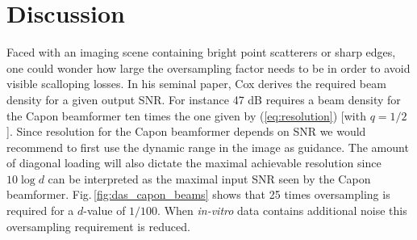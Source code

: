 \documentclass[draftcls]{IEEEtran}
\newcommand{\img}{img/}
\newcommand\comment[1]{\textit{{\color{red}(#1)}}}
\begin{document}

\section{Discussion}\label{sec:dis}

Faced with an imaging scene containing bright point scatterers or sharp edges, one could wonder how large the oversampling factor needs to be in order to avoid visible scalloping losses. In his seminal paper, Cox \cite{Cox1973} derives the required beam density for a given output SNR. For instance 47 dB requires a beam density for the Capon beamformer ten times the one given by (\ref{eq:resolution}) [with $q=1/2$]. Since resolution for the Capon beamformer depends on SNR we would recommend to first use the dynamic range in the image as guidance. The amount of diagonal loading will also dictate the maximal achievable resolution since $10\log{d}$ can be interpreted as the maximal input SNR seen by the Capon beamformer. Fig.\,\ref{fig:das_capon_beams} shows that 25 times oversampling is required for a $d$-value of $1/100$. When \textit{in-vitro} data contains additional noise this oversampling requirement is reduced.%
\end{document}
